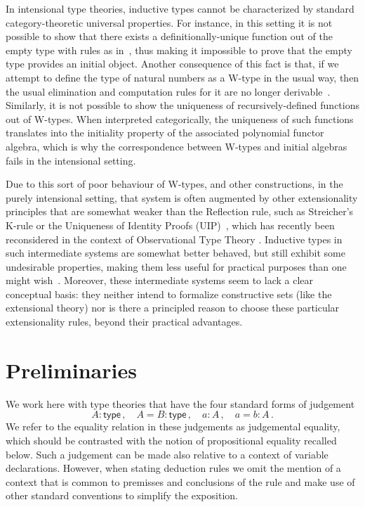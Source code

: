 \documentclass[10pt,a4paper,oneside,reqno]{amsart}
\numberwithin{equation}{section}
\theoremstyle{mythm}
\theoremstyle{mydef}
\theoremstyle{myrmk}
\newcommand{\deq}{=}
\newcommand{\co}{\colon}
\newcommand{\type}{\mathsf{type}}
\begin{document}
\vspace{3cm}

In intensional type theories, inductive types cannot be characterized by standard category-theoretic
universal properties. For instance, in this setting it is not possible to show that there exists a 
definitionally-unique function out of the empty type with rules as in~\cite[Section~5.2]{NordstromB:marltt}, thus making it impossible to prove that the empty type provides an initial object. 
Another consequence of this fact is that, if we attempt to define the type of 
natural numbers as a W-type in the usual way, then 
the usual elimination and computation rules for it are no longer derivable~\cite{DybjerP:repids}. Similarly, it is not possible to show the uniqueness of recursively-defined functions out of W-types. When interpreted categorically, the uniqueness of such functions translates into the initiality property of the associated polynomial functor algebra, which is why the correspondence between W-types and initial algebras fails in the intensional setting.

Due to this sort of poor behaviour of W-types, and other constructions, in the purely intensional setting, that system is often augmented by other extensionality principles that are somewhat weaker than the Reflection rule, such as Streicher's K-rule  or the Uniqueness of Identity Proofs (UIP)~\cite{StreicherT:invitt}, which has recently been reconsidered
in the context of Observational Type Theory \cite{AltenkirchT:obsen}.  Inductive types in such intermediate systems are somewhat better behaved, but still exhibit some undesirable properties, making them less useful for practical purposes than one might wish~\cite{McBrideC:wtygnb}.  Moreover, these intermediate systems seem to lack a clear conceptual basis:  they neither intend to formalize constructive sets (like the extensional theory) nor is there a principled reason to choose these particular extensionality rules, beyond their practical advantages.  

\newpage

\section{Preliminaries}
\label{section:prelim}



We work here with type theories that have the four standard forms of judgement
\[
A \co \type \, , \quad A \deq B \co \type \, , \quad   a \co A \, , \quad a \deq b \co A \, . 
\]
We refer to the equality relation in these judgements as judgemental equality, 
which should be contrasted with the notion of propositional equality
recalled below. 
Such a judgement  can be made also relative to a context of variable declarations.
However, when stating deduction
rules we  omit the mention
of a context that is common to premisses and conclusions of the rule and
make use of other standard conventions to simplify the exposition.
\end{document}
